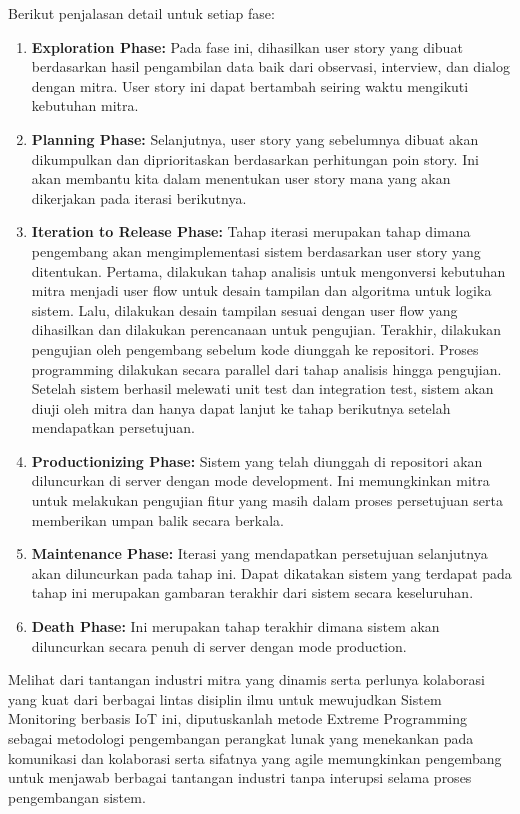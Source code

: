 Berikut penjalasan detail untuk setiap fase:
\begin{enumerate}
    \item \textbf{Exploration Phase:}
    Pada fase ini, dihasilkan user story yang dibuat berdasarkan hasil pengambilan data baik dari observasi, interview, dan dialog dengan mitra. User story ini dapat bertambah seiring waktu mengikuti kebutuhan mitra.

    \item \textbf{Planning Phase:}
    Selanjutnya, user story yang sebelumnya dibuat akan dikumpulkan dan diprioritaskan berdasarkan perhitungan poin story. Ini akan membantu kita dalam menentukan user story mana yang akan dikerjakan pada iterasi berikutnya.
    
    \item \textbf{Iteration to Release Phase:}
    Tahap iterasi merupakan tahap dimana pengembang akan mengimplementasi sistem berdasarkan user story yang ditentukan. Pertama, dilakukan tahap analisis untuk mengonversi kebutuhan mitra menjadi user flow untuk desain tampilan dan algoritma untuk logika sistem. Lalu, dilakukan desain tampilan sesuai dengan user flow yang dihasilkan dan dilakukan perencanaan untuk pengujian. Terakhir, dilakukan pengujian oleh pengembang sebelum kode diunggah ke repositori. Proses programming dilakukan secara parallel dari tahap analisis hingga pengujian. Setelah sistem berhasil melewati unit test dan integration test, sistem akan diuji oleh mitra dan hanya dapat lanjut ke tahap berikutnya setelah mendapatkan persetujuan.
    
    \item \textbf{Productionizing Phase:}
    Sistem yang telah diunggah di repositori akan diluncurkan di server dengan mode development. Ini memungkinkan mitra untuk melakukan pengujian fitur yang masih dalam proses persetujuan serta memberikan umpan balik secara berkala. 
    
    \item \textbf{Maintenance Phase:}
    Iterasi yang mendapatkan persetujuan selanjutnya akan diluncurkan pada tahap ini. Dapat dikatakan sistem yang terdapat pada tahap ini merupakan gambaran terakhir dari sistem secara keseluruhan.
    
    \item \textbf{Death Phase:}
    Ini merupakan tahap terakhir dimana sistem akan diluncurkan secara penuh di server dengan mode production.
\end{enumerate}

Melihat dari tantangan industri mitra yang dinamis serta perlunya kolaborasi yang kuat dari berbagai lintas disiplin ilmu untuk mewujudkan Sistem Monitoring berbasis IoT ini, diputuskanlah metode Extreme Programming sebagai metodologi pengembangan perangkat lunak yang menekankan pada komunikasi dan kolaborasi serta sifatnya yang agile memungkinkan pengembang untuk menjawab berbagai tantangan industri tanpa interupsi selama proses pengembangan sistem.


